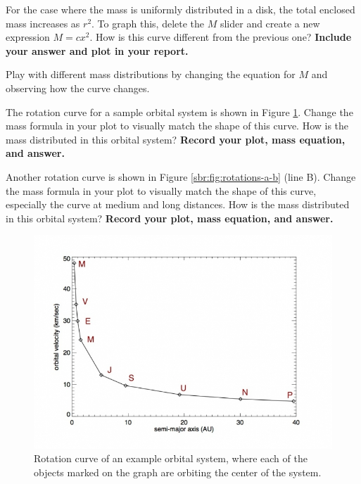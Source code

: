 \begin{steps}
	
	\item For the case where the mass is uniformly distributed in a disk, the total enclosed mass increases as $r^2$. To graph this, delete the $M$ slider and create a new expression $M = c x^2$. How is this curve different from the previous one? \textbf{Include your answer and plot in your report.}
	
	\item Play with different mass distributions by changing the equation for $M$ and observing how the curve changes.
	
	\item The rotation curve for a sample orbital system is shown in Figure \ref{sbr:fig:solar-rot}. Change the mass formula in your plot to visually match the shape of this curve. How is the mass distributed in this orbital system? \textbf{Record your plot, mass equation, and answer.}
	
	\item Another rotation curve is shown in Figure \ref{sbr:fig:rotations-a-b} (line B). Change the mass formula in your plot to visually match the shape of this curve, especially the curve at medium and long distances. How is the mass distributed in this orbital system? \textbf{Record your plot, mass equation, and answer.}
\end{steps}

\begin{figure}
	\centering
	\includegraphics[scale = .6]{srt-background-rotation/keplerian-orbit.jpg}
	\caption{Rotation curve of an example orbital system, where each of the objects marked on the graph are orbiting the center of the system.}\label{sbr:fig:solar-rot}
\end{figure}

